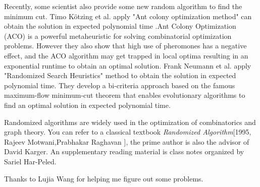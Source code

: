 \documentclass[11pt]{article}
\theoremstyle{plain}
\theoremstyle{definition}
\theoremstyle{remark}
\begin{document}
	Recently, some scientist also provide some new random algorithm to find the minimum cut. Timo Kötzing et al. apply "Ant colony optimization method" can obtain the solution in expected polynomial time \cite{kotzing2010ant}.Ant Colony Optimization (ACO) is a powerful metaheuristic for solving combinatorial optimization problems. However they also show that high use of pheromones has a negative effect, and the ACO algorithm may get trapped in local optima resulting in an exponential runtime to obtain an optimal solution.  Frank Neumann et al. apply "Randomized Search Heuristics" method to obtain the solution in expected polynomial time\cite{neumann2011computing}. They develop a bi-criteria approach based on the famous maximum-flow minimum-cut theorem that enables evolutionary algorithms to find an optimal solution in expected polynomial time.
	
	Randomized algorithms are widely used in the optimization of combinatorics and graph theory. You can refer to a classical textbook \textit{Randomized Algorithm}[1995, Rajeev Motwani,Prabhakar Raghavan \cite{motwani1995randomized}], the prime author is also the advisor of David Karger. An supplementary reading material is class notes organized by Sariel Har-Peled\cite{har2005class}.
	
	Thanks to Lujia Wang for helping me figure out some problems.
\newpage


\end{document}
